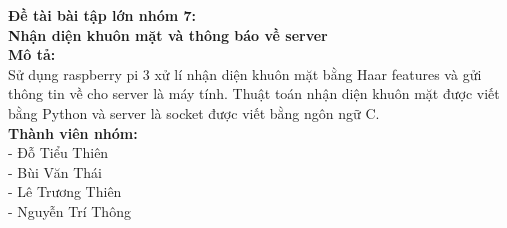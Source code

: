 \documentclass[12pt,a4paper]{article}
\begin{document}
\textbf{Đề tài bài tập lớn nhóm 7:\\Nhận diện khuôn mặt và thông báo về server}\\[0.5cm]
\textbf{Mô tả:}\\Sử dụng raspberry pi 3 xử lí nhận diện khuôn mặt bằng Haar features và gửi thông tin về cho server là máy tính. Thuật toán nhận diện khuôn mặt được viết bằng Python và server là socket được viết bằng ngôn ngữ C.\\[0.5cm]
\textbf{Thành viên nhóm:}\\
- Đỗ Tiểu Thiên\\
- Bùi Văn Thái\\
- Lê Trương Thiên\\
- Nguyễn Trí Thông\\
\end{document}
